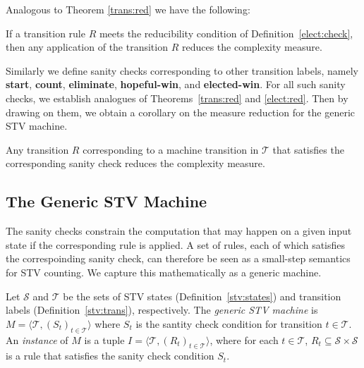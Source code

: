 \documentclass{llncs}
\begin{document}
\noindent
Analogous to Theorem \ref{trans:red} we have the following:
\begin{theorem}\label{elect:red}
If a transition rule $R$ meets the reducibility condition of
Definition~\ref{elect:check},  
then any application of the transition $R$ reduces the complexity measure.
\end{theorem}

\noindent
Similarly we define sanity checks corresponding to other transition
labels, namely 
\textbf{start}, \textbf{count}, \textbf{eliminate},
\textbf{hopeful-win}, and \textbf{elected-win}. 
For all such sanity checks, we establish analogues of 
Theorems~\ref{trans:red} and \ref{elect:red}. Then by drawing on them, we obtain
a corollary on the measure reduction for the generic STV machine.
\begin{corollary}\label{measure:reduction}
Any transition $R$ corresponding to a machine transition in
$\mathcal{T}$ that satisfies the corresponding sanity check reduces the complexity measure.
\end{corollary}  



\subsection{The Generic STV Machine} 
The sanity checks constrain the computation that may happen on a
given input state if the corresponding rule is applied. A set of
rules, each of which satisfies the correspoinding sanity check, can
therefore be seen as a small-step semantics for STV counting. We
capture this mathematically as a generic machine.

\begin{definition}
Let $\mathcal{S}$ 
and
$\mathcal{T}$
be the sets of STV states (Definition~\ref{stv:states})
and  
transition labels (Definition~\ref{stv:trans}), respectively. 
The \emph{generic
STV machine} is $M = \langle \mathcal{T}, (S_t)_{t \in \mathcal{T}}
\rangle$ where $S_t$ is the santity check condition 
for 
transition $t \in \mathcal{T}$. 
An \emph{instance} of 
$M$
is a tuple $I = \langle \mathcal{T}, (R_t)_{t \in
\mathcal{T}} \rangle$, where for each $t \in \mathcal{T}$, $R_t
\subseteq \mathcal{S} \times \mathcal{S}$ is a rule that satisfies
the sanity check condition $S_t$. 
\end{definition}
\end{document}

